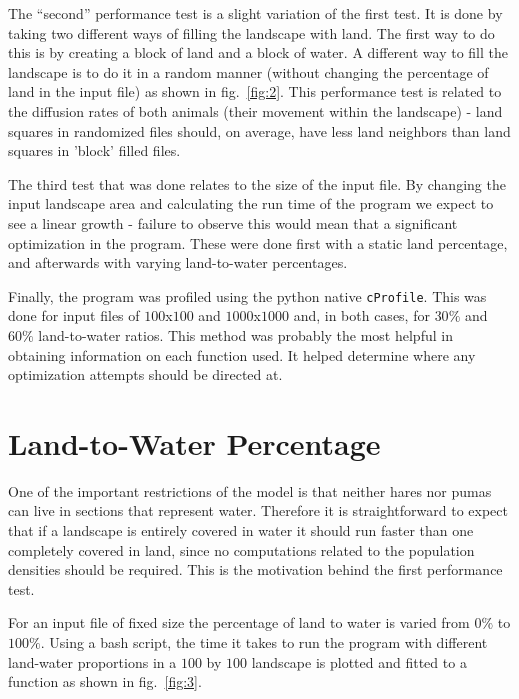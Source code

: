 \documentclass[12pt,a4paper]{article}
\begin{document}
The ``second'' performance test is a slight variation of the first test. It is 
done by taking two different ways of filling the landscape with land. The first 
way to do this is by creating a block of land and a block of water. A different 
way to fill the landscape is to do it in a random manner (without changing the 
percentage of land in the input file) as shown in fig.~\ref{fig:2}. This 
performance test is related to the diffusion rates of both animals (their 
movement within the landscape) - land 
squares in randomized files should, on average, have less land neighbors than 
land squares in 'block' filled files. 

The third test that was done relates to the size of the input file. By changing 
the input landscape area and calculating the run time of the program we expect 
to see a linear growth - failure to observe this would mean that a significant 
optimization in the program. These were done first with a static land 
percentage, and afterwards with varying land-to-water percentages.

Finally, the program was profiled using the python native \texttt{cProfile}. 
This was done for input files of $100$x$100$ and $1000$x$1000$ and, in both 
cases, for $30\%$ and $60\%$ land-to-water ratios. This method was probably the 
most helpful in obtaining information on each function used. It helped 
determine where any optimization attempts should be directed at.

\section{Land-to-Water Percentage}

One of the important restrictions of the model is that neither hares nor 
pumas can live in sections that represent water. Therefore it is 
straightforward to expect 
that if a landscape is entirely covered in water it should run faster than one 
completely covered 
in land, since no computations related to the population densities should be 
required. This is the motivation behind the first performance test.

For an input file of fixed size the percentage of land to water is varied from 
$0\%$ to $100\%$. Using a bash script, the time it takes to run the program 
with different land-water proportions in a $100$ by $100$ landscape is plotted 
and fitted to a function as shown in fig.~\ref{fig:3}.
\end{document}
